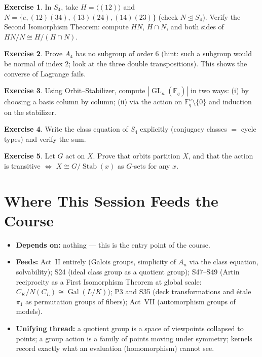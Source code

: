 \documentclass[11pt,a4paper]{article}
\theoremstyle{definition}
\newtheorem{exercise}{Exercise}
\newcommand{\F}{\mathbb{F}}
\newcommand{\GL}{\operatorname{GL}}
\newcommand{\Gal}{\operatorname{Gal}}
\newcommand{\Stab}{\operatorname{Stab}}
\begin{document}
	\begin{exercise}
		In $S_4$, take $H=\langle(12)\rangle$ and $N=\{e,(12)(34),(13)(24),(14)(23)\}$ (check $N\trianglelefteq S_4$).
		Verify the Second Isomorphism Theorem: compute $HN$, $H\cap N$, and both sides of $HN/N\cong H/(H\cap N)$.
	\end{exercise}
	\begin{exercise}\label{ex:a4}
		Prove $A_4$ has no subgroup of order $6$ (hint: such a subgroup would be normal of index $2$; look at
		the three double transpositions). This shows the converse of Lagrange fails.
	\end{exercise}
	\begin{exercise}
		Using Orbit--Stabilizer, compute $|\GL_n(\F_q)|$ in two ways: (i) by choosing a basis column by
		column; (ii) via the action on $\F_q^n\setminus\{0\}$ and induction on the stabilizer.
	\end{exercise}
	\begin{exercise}
		Write the class equation of $S_4$ explicitly (conjugacy classes $=$ cycle types) and verify the sum.
	\end{exercise}
	\begin{exercise}
		Let $G$ act on $X$. Prove that orbits partition $X$, and that the action is transitive $\iff$
		$X\cong G/\Stab(x)$ as $G$-sets for any $x$.
	\end{exercise}
	
	\section*{Where This Session Feeds the Course}
	\begin{itemize}
		\item \textbf{Depends on:} nothing --- this is the entry point of the course.
		\item \textbf{Feeds:} Act~II entirely (Galois groups, simplicity of $A_n$ via the class equation,
		solvability); S24 (ideal class group as a quotient group); S47--S49 (Artin reciprocity as a First
		Isomorphism Theorem at global scale: $C_K/N(C_L)\cong\Gal(L/K)$); P3 and S35 (deck transformations
		and \'etale $\pi_1$ as permutation groups of fibers); Act~VII (automorphism groups of models).
		\item \textbf{Unifying thread:} a quotient group is a space of viewpoints collapsed to points; a
		group action is a family of points moving under symmetry; kernels record exactly what an
		evaluation (homomorphism) cannot see.
	\end{itemize}
	
\end{document}
